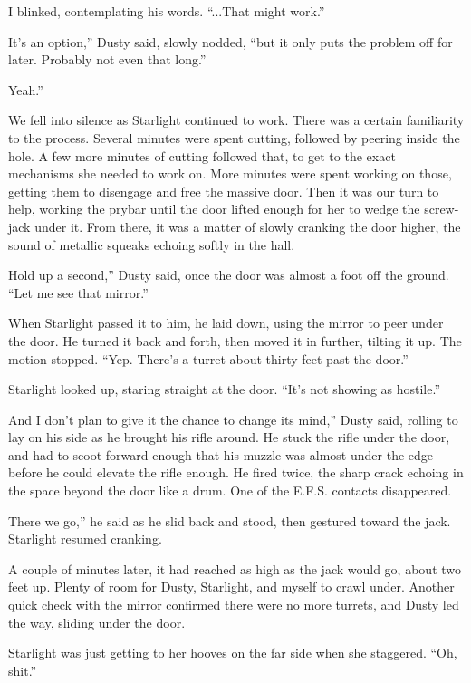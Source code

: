 I blinked, contemplating his words. “...That might work.”

\leavevmode{}It’s an option,” Dusty said, slowly nodded, “but it only puts the problem off for later. Probably not even that long.”

\leavevmode{}Yeah.”

We fell into silence as Starlight continued to work. There was a certain familiarity to the process. Several minutes were spent cutting, followed by peering inside the hole. A few more minutes of cutting followed that, to get to the exact mechanisms she needed to work on. More minutes were spent working on those, getting them to disengage and free the massive door. Then it was our turn to help, working the prybar until the door lifted enough for her to wedge the screw-jack under it. From there, it was a matter of slowly cranking the door higher, the sound of metallic squeaks echoing softly in the hall.

\leavevmode{}Hold up a second,” Dusty said, once the door was almost a foot off the ground. “Let me see that mirror.”

When Starlight passed it to him, he laid down, using the mirror to peer under the door. He turned it back and forth, then moved it in further, tilting it up. The motion stopped. “Yep. There’s a turret about thirty feet past the door.”

Starlight looked up, staring straight at the door. “It’s not showing as hostile.”

\leavevmode{}And I don’t plan to give it the chance to change its mind,” Dusty said, rolling to lay on his side as he brought his rifle around. He stuck the rifle under the door, and had to scoot forward enough that his muzzle was almost under the edge before he could elevate the rifle enough. He fired twice, the sharp crack echoing in the space beyond the door like a drum. One of the E.F.S. contacts disappeared.

\leavevmode{}There we go,” he said as he slid back and stood, then gestured toward the jack. Starlight resumed cranking.

A couple of minutes later, it had reached as high as the jack would go, about two feet up. Plenty of room for Dusty, Starlight, and myself to crawl under. Another quick check with the mirror confirmed there were no more turrets, and Dusty led the way, sliding under the door.

Starlight was just getting to her hooves on the far side when she staggered. “Oh, shit.”

